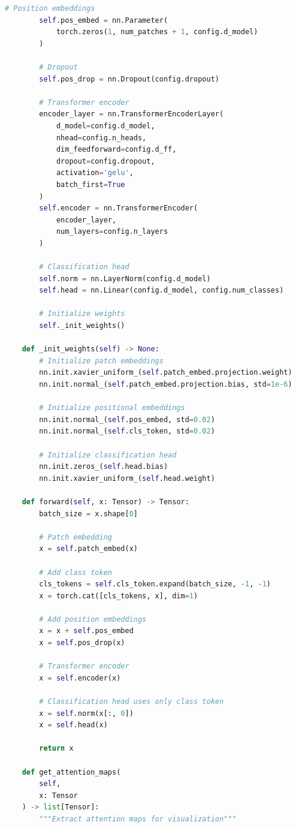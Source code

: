 \documentclass[11pt]{article}
\begin{document}
\begin{lstlisting}[language=Python, caption=Vision Transformer Implementation]
        # Position embeddings
        self.pos_embed = nn.Parameter(
            torch.zeros(1, num_patches + 1, config.d_model)
        )
        
        # Dropout
        self.pos_drop = nn.Dropout(config.dropout)
        
        # Transformer encoder
        encoder_layer = nn.TransformerEncoderLayer(
            d_model=config.d_model,
            nhead=config.n_heads,
            dim_feedforward=config.d_ff,
            dropout=config.dropout,
            activation='gelu',
            batch_first=True
        )
        self.encoder = nn.TransformerEncoder(
            encoder_layer,
            num_layers=config.n_layers
        )
        
        # Classification head
        self.norm = nn.LayerNorm(config.d_model)
        self.head = nn.Linear(config.d_model, config.num_classes)
        
        # Initialize weights
        self._init_weights()
        
    def _init_weights(self) -> None:
        # Initialize patch embeddings
        nn.init.xavier_uniform_(self.patch_embed.projection.weight)
        nn.init.normal_(self.patch_embed.projection.bias, std=1e-6)
        
        # Initialize positional embeddings
        nn.init.normal_(self.pos_embed, std=0.02)
        nn.init.normal_(self.cls_token, std=0.02)
        
        # Initialize classification head
        nn.init.zeros_(self.head.bias)
        nn.init.xavier_uniform_(self.head.weight)
        
    def forward(self, x: Tensor) -> Tensor:
        batch_size = x.shape[0]
        
        # Patch embedding
        x = self.patch_embed(x)
        
        # Add class token
        cls_tokens = self.cls_token.expand(batch_size, -1, -1)
        x = torch.cat([cls_tokens, x], dim=1)
        
        # Add position embeddings
        x = x + self.pos_embed
        x = self.pos_drop(x)
        
        # Transformer encoder
        x = self.encoder(x)
        
        # Classification head uses only class token
        x = self.norm(x[:, 0])
        x = self.head(x)
        
        return x
    
    def get_attention_maps(
        self,
        x: Tensor
    ) -> list[Tensor]:
        """Extract attention maps for visualization"""
        

\end{lstlisting}
\end{document}
